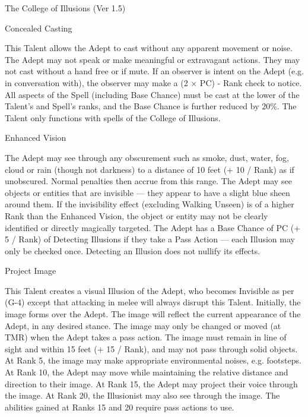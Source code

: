 \begin{Chapter}{The College of Illusions (Ver 1.5)}
\begin{talent}[T-1]{Concealed Casting}
\begin{effects}
This Talent allows the Adept to cast without any apparent movement or
noise.  The Adept may not speak or make meaningful or extravagant
actions. They may not cast without a hand free or if mute.  If an
observer is intent on the Adept (e.g. in conversation with), the
observer may make a (2 × PC) - Rank check to notice. All aspects of
the Spell (including Base Chance) must be cast at the lower of the
Talent’s and Spell’s ranks, and the Base Chance is further reduced by
20\%. The Talent only functions with spells of the College of
Illusions.
\end{effects}
\end{talent}

\begin{talent}[T-2]{Enhanced Vision}

\begin{effects}
The Adept may see through any obscurement such as smoke, dust, water,
fog, cloud or rain (though not darkness) to a distance of 10 feet (+
10 / Rank) as if unobscured.  Normal penalties then accrue from this
range. The Adept may see objects or entities that are invisible — they
appear to have a slight blue sheen around them.  If the invisibility
effect (excluding Walking Unseen) is of a higher Rank than the
Enhanced Vision, the object or entity may not be clearly identified or
directly magically targeted. The Adept has a Base Chance of PC (+ 5 /
Rank) of Detecting Illusions if they take a Pass Action — each
Illusion may only be checked once.  Detecting an Illusion does not
nullify its effects.
\end{effects}
\end{talent}

\begin{talent}[T-3]{Project Image}

\begin{effects}
This Talent creates a visual Illusion of the Adept, who becomes
Invisible as per (G-4) except that attacking in melee will always
disrupt this Talent.  Initially, the image forms over the Adept.  The
image will reflect the current appearance of the Adept, in any desired
stance.  The image may only be changed or moved (at TMR) when the
Adept takes a pass action. The image must remain in line of sight and
within 15 feet (+ 15 / Rank), and may not pass through solid objects.
At Rank 5, the image may make appropriate environmental noises,
e.g. footsteps.  At Rank 10, the Adept may move while maintaining the
relative distance and direction to their image.  At Rank 15, the Adept
may project their voice through the image. At Rank 20, the Illusionist
may also see through the image.  The abilities gained at Ranks 15 and
20 require pass actions to use.
\end{effects}
\end{talent}


\end{Chapter}
